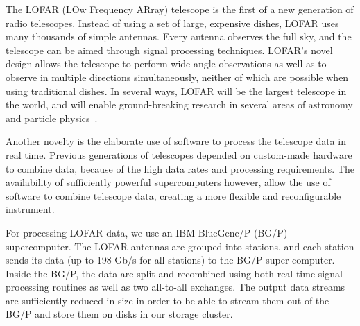 \documentclass{llncs}
\begin{document}


The LOFAR (LOw Frequency ARray) telescope is the first of a new generation of radio telescopes. Instead of using a set of large, expensive dishes, LOFAR uses many thousands of simple antennas. Every antenna observes the full sky, and the telescope can be aimed through signal processing techniques. LOFAR's novel design allows the telescope to perform wide-angle observations as well as to observe in multiple directions simultaneously, neither of which are possible when using traditional dishes. In several ways, LOFAR will be the largest telescope in the world, and will enable ground-breaking research in several areas of astronomy and particle physics~\cite{Bruyn:02}.

Another novelty is the elaborate use of software to process the telescope data in real time. Previous generations of telescopes depended on custom-made hardware to combine data, because of the high data rates and processing requirements. The availability of sufficiently powerful supercomputers however, allow the use of software to combine telescope data, creating a more flexible and reconfigurable instrument.

For processing LOFAR data, we use an IBM BlueGene/P (BG/P) supercomputer. The LOFAR antennas are grouped into stations, and each station sends its data (up to 198 Gb/s for all stations) to the BG/P super computer. Inside the BG/P, the data are split and recombined using both real-time signal processing routines as well as two all-to-all exchanges. The output data streams are sufficiently reduced in size in order to be able to stream them out of the BG/P and store them on disks in our storage cluster.
\end{document}
